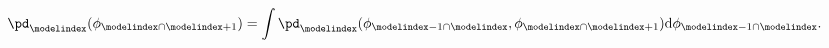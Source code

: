 \begin{equation}
  \pd_{\modelindex}(\phi_{\modelindex \cap \modelindex + 1}) = 
  \int \pd_{\modelindex} (\phi_{\modelindex - 1 \cap \modelindex}, \phi_{\modelindex \cap \modelindex + 1}) \text{d}\phi_{\modelindex - 1 \cap \modelindex}.
  \label{eqn:M-model-linear-pooling-marg}
\end{equation}